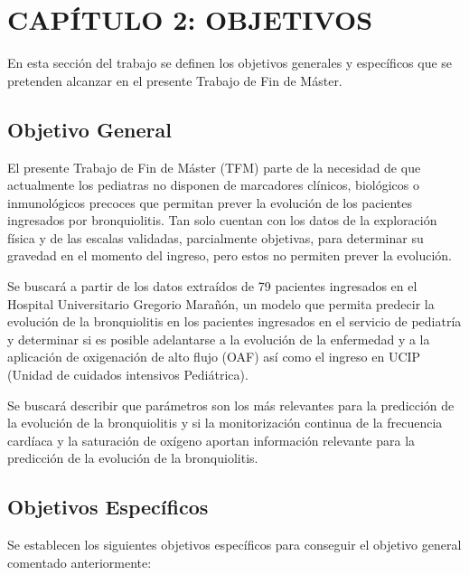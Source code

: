 \section{CAPÍTULO 2: OBJETIVOS}\label{sec:objectives}

En esta sección del trabajo se definen los objetivos generales y específicos que se pretenden alcanzar en el presente Trabajo de Fin de Máster. 

\subsection{Objetivo General}

El presente Trabajo de Fin de Máster (TFM) parte de la necesidad de que actualmente los pediatras no disponen de marcadores clínicos, biológicos o inmunológicos precoces que permitan prever la evolución de los pacientes ingresados por bronquiolitis. Tan solo cuentan con los datos de la exploración física y de las escalas validadas, parcialmente objetivas, para determinar su gravedad en el momento del ingreso, pero estos no permiten prever la evolución. 

Se buscará a partir de los datos extraídos de 79 pacientes ingresados en el Hospital Universitario Gregorio Marañón, un modelo que permita predecir la evolución de la bronquiolitis en los pacientes ingresados en el servicio de pediatría y determinar si es posible adelantarse a la evolución de la enfermedad y a la aplicación de oxigenación de alto flujo (OAF) así como el ingreso en UCIP (Unidad de cuidados intensivos Pediátrica).

Se buscará describir que parámetros son los más relevantes para la predicción de la evolución de la bronquiolitis y si la monitorización continua de la frecuencia cardíaca y la saturación de oxígeno aportan información relevante para la predicción de la evolución de la bronquiolitis.

\subsection{Objetivos Específicos}

Se establecen los siguientes objetivos específicos para conseguir el objetivo general comentado anteriormente:

